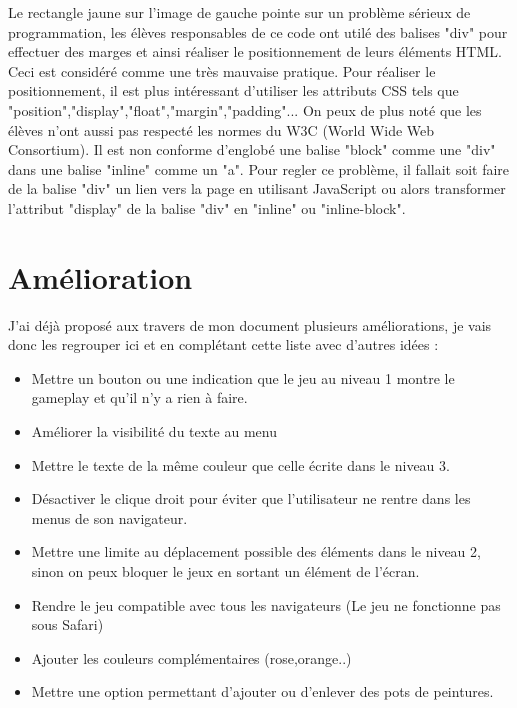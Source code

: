 \documentclass{article}
\begin{document}
Le rectangle jaune sur l'image de gauche pointe sur un problème sérieux de programmation, les élèves responsables de ce code ont utilé des balises "div" pour effectuer des marges et ainsi réaliser le positionnement de leurs éléments HTML. Ceci est considéré comme une très mauvaise pratique. Pour réaliser le positionnement, il est plus intéressant d'utiliser les attributs CSS tels que "position","display","float","margin","padding"... On peux de plus noté que les élèves n'ont aussi pas respecté les normes du W3C (World Wide Web Consortium). Il est non conforme d'englobé une balise "block" comme une "div" dans une balise "inline" comme un "a". Pour regler ce problème, il fallait soit faire de la balise "div" un lien vers la page en utilisant JavaScript ou alors transformer l'attribut "display" de la balise "div" en "inline" ou "inline-block".\\

\newpage
\section{Amélioration}

\hspace*{0.6cm}J'ai déjà proposé aux travers de mon document plusieurs améliorations, je vais donc les regrouper ici et en complétant cette liste avec d'autres idées :\\
\begin{itemize}
  \item Mettre un bouton ou une indication que le jeu au niveau 1 montre le gameplay et qu'il n'y a rien à faire.
  \item Améliorer la visibilité du texte au menu
  \item Mettre le texte de la même couleur que celle écrite dans le niveau 3.
  \item Désactiver le clique droit pour éviter que l'utilisateur ne rentre dans les menus de son navigateur.
  \item Mettre une limite au déplacement possible des éléments dans le niveau 2, sinon on peux bloquer le jeux en sortant un élément de l'écran.
  \item Rendre le jeu compatible avec tous les navigateurs (Le jeu ne fonctionne pas sous Safari)
  \item Ajouter les couleurs complémentaires (rose,orange..)
  \item Mettre une option permettant d'ajouter ou d'enlever des pots de peintures.
\end{itemize}
\end{document}
